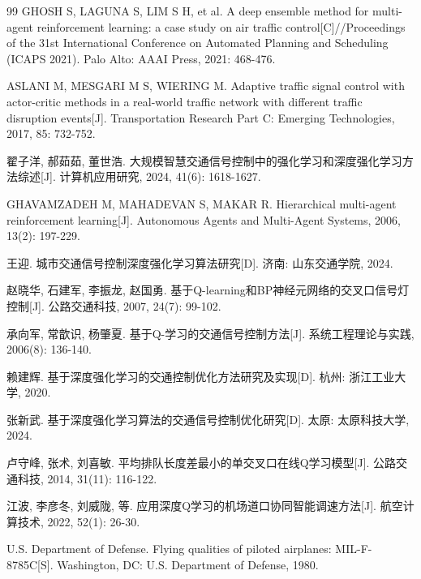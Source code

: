 \documentclass[12pt,a4paper,UTF8]{ctexart}
\begin{document}
\begin{thebibliography}{99}
 GHOSH S, LAGUNA S, LIM S H, et al. A deep ensemble method for multi-agent reinforcement learning: a case study on air traffic control[C]//Proceedings of the 31st International Conference on Automated Planning and Scheduling (ICAPS 2021). Palo Alto: AAAI Press, 2021: 468-476.

 ASLANI M, MESGARI M S, WIERING M. Adaptive traffic signal control with actor-critic methods in a real-world traffic network with different traffic disruption events[J]. Transportation Research Part C: Emerging Technologies, 2017, 85: 732-752.

 翟子洋, 郝茹茹, 董世浩. 大规模智慧交通信号控制中的强化学习和深度强化学习方法综述[J]. 计算机应用研究, 2024, 41(6): 1618-1627.

 GHAVAMZADEH M, MAHADEVAN S, MAKAR R. Hierarchical multi-agent reinforcement learning[J]. Autonomous Agents and Multi-Agent Systems, 2006, 13(2): 197-229.

 王迎. 城市交通信号控制深度强化学习算法研究[D]. 济南: 山东交通学院, 2024.

 赵晓华, 石建军, 李振龙, 赵国勇. 基于Q-learning和BP神经元网络的交叉口信号灯控制[J]. 公路交通科技, 2007, 24(7): 99-102.

 承向军, 常歆识, 杨肇夏. 基于Q-学习的交通信号控制方法[J]. 系统工程理论与实践, 2006(8): 136-140.

 赖建辉. 基于深度强化学习的交通控制优化方法研究及实现[D]. 杭州: 浙江工业大学, 2020.

 张新武. 基于深度强化学习算法的交通信号控制优化研究[D]. 太原: 太原科技大学, 2024.

 卢守峰, 张术, 刘喜敏. 平均排队长度差最小的单交叉口在线Q学习模型[J]. 公路交通科技, 2014, 31(11): 116-122.

 江波, 李彦冬, 刘威陇, 等. 应用深度Q学习的机场道口协同智能调速方法[J]. 航空计算技术, 2022, 52(1): 26-30.

 U.S. Department of Defense. Flying qualities of piloted airplanes: MIL-F-8785C[S]. Washington, DC: U.S. Department of Defense, 1980.


\end{thebibliography}
\end{document}
